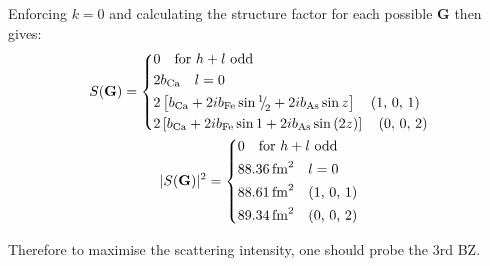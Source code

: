\begin{parts}
\begin{subparts}
		Enforcing $k=0$ and calculating the structure factor for each possible $\mathbf{G}$ then gives:
		\begin{gather*}
			S(\mathbf{G}) =
			\begin{cases*}
				0 \textnormal{\hspace{1em}for $h+l$ odd} \\
				2 b_\textnormal{Ca} \textnormal{\hspace{1em}}l=0 \\
				2 \left[ b_\textnormal{Ca} + 2ib_\textnormal{Fe} \sin\diagfrac{1}{2} + 2ib_\textnormal{As} \sin z \right] \textnormal{\hspace{1em}(1, 0, 1)} \\
				2 \left[ b_\textnormal{Ca} + 2ib_\textnormal{Fe} \sin 1 + 2ib_\textnormal{As} \sin\left(2z\right) \right] \textnormal{\hspace{1em}(0, 0, 2)}
			\end{cases*} \\
			|S(\mathbf{G})|^2 =
			\begin{cases*}
				0 \textnormal{\hspace{1em}for $h+l$ odd} \\
				\SI{88.36}{\femto\metre\squared} \textnormal{\hspace{1em}}l=0 \\
				\SI{88.61}{\femto\metre\squared} \textnormal{\hspace{1em}(1, 0, 1)} \\
				\SI{89.34}{\femto\metre\squared} \textnormal{\hspace{1em}(0, 0, 2)}
			\end{cases*}
		\end{gather*}
		
		Therefore to maximise the scattering intensity, one should probe the 3rd BZ.
	\end{subparts}
\end{parts}
